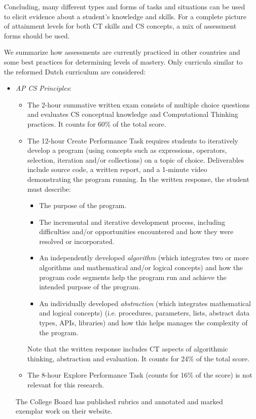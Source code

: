 Concluding, many different types and forms of tasks and situations can be used to elicit evidence about a student's knowledge and skills. For a complete picture of attainment levels for both CT skills and CS concepts, a mix of assessment forms should be used.


We summarize how assessments are currently practiced in other countries and some best practices for determining levels of mastery. Only curricula similar to the reformed Dutch curriculum are considered:

\begin{itemize}
\item \emph{AP CS Principles}:

    \begin{itemize}
    \item The 2-hour summative written exam consists of multiple choice questions and evaluates CS conceptual knowledge and Computational Thinking practices. It counts for 60\% of the total score.
    \item The 12-hour Create Performance Task requires students to iteratively develop a program (using concepts such as expressions, operators, selection, iteration and/or collections) on a topic of choice. Deliverables include source code, a written report, and a 1-minute video demonstrating the program running. In the written response, the student must describe:
         \begin{itemize}
         \item The purpose of the program.
         \item The incremental and iterative development process, including difficulties and/or opportunities encountered and how they were resolved or incorporated.
         \item An independently developed \emph{algorithm} (which integrates two or more algorithms and mathematical and/or logical concepts) and how the program code segments help the program run and achieve the intended purpose of the program.
         \item An individually developed \emph{abstraction} (which integrates mathematical and logical concepts) (i.e. procedures, parameters, lists, abstract data types, APIs, libraries) and how this helps manages the complexity of the program.
         \end{itemize}
         Note that the written response includes CT aspects of algorithmic thinking, abstraction and evaluation. It counts for 24\% of the total score.
    \item The 8-hour Explore Performance Task (counts for 16\% of the score) is not relevant for this research.
    \end{itemize}
    The College Board has published rubrics and annotated and marked exemplar work on their website.


\end{itemize}
